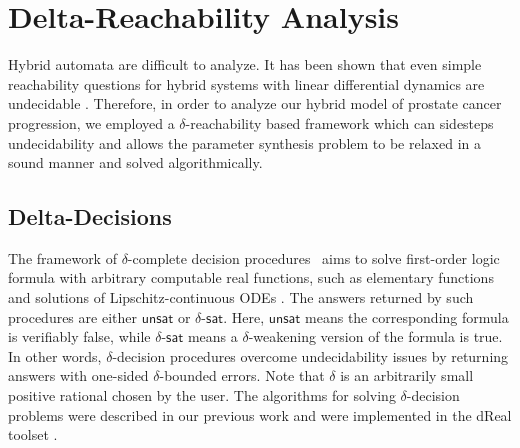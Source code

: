 \section{Delta-Reachability Analysis}



Hybrid automata are difficult to analyze. It has been shown that even simple reachability questions for hybrid 
systems with linear differential dynamics are undecidable \citep{henzinger96}. Therefore, in order to analyze our hybrid model of prostate cancer progression, we employed a $\delta$-reachability based framework \cite{liu14} which can sidesteps undecidability and allows the parameter synthesis problem to be relaxed in a sound manner and solved algorithmically. 

\subsection{Delta-Decisions}
The framework of $\delta$-complete decision procedures~\cite{gao12a} aims to solve first-order logic formula with arbitrary computable real functions, such as elementary functions and solutions of Lipschitz-continuous ODEs \citep{gao12b}. The answers returned by such procedures are either $\mathsf{unsat}$ or $\delta$-$\mathsf{sat}$. Here, $\mathsf{unsat}$ means the corresponding formula is verifiably false, while $\delta$-$\mathsf{sat}$ means a $\delta$-weakening version of the formula is true. In other words, $\delta$-decision procedures overcome undecidability issues by returning answers with one-sided $\delta$-bounded errors. Note that $\delta$ is an arbitrarily small positive rational chosen by the user. The algorithms for solving $\delta$-decision problems were described in our previous work \cite{gao12b,gao13} and were implemented in the dReal toolset \cite{dreal}. 

